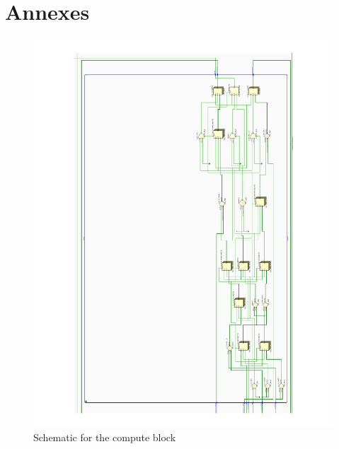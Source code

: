 \section{Annexes}
    \begin{figure}[H]
        \centering
        \includegraphics[width=\textwidth]{annexes/compute.pdf}
        \caption{Schematic for the compute block}
        \label{anx:compute}
    \end{figure}
    \pagebreak
